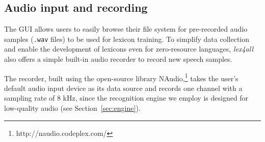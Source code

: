 \documentclass[11pt]{article}
\begin{document}
\subsection{Audio input and recording}
\label{sec:recording}


The GUI allows users to easily browse their file system for pre-recorded audio samples (\texttt{.wav} files) to be used for lexicon training. 
To simplify data collection and enable the development of lexicons even for zero-resource languages, \textit{lex4all} also offers a simple built-in audio recorder to record new speech samples.

The recorder, 
built using the open-source library NAudio,\footnote{http://naudio.codeplex.com/}
takes the user's default audio input device as its data source and records one channel with a sampling rate of 8 kHz, since
the recognition engine we employ is designed for low-quality audio (see Section~\ref{sec:engine}).

\end{document}
